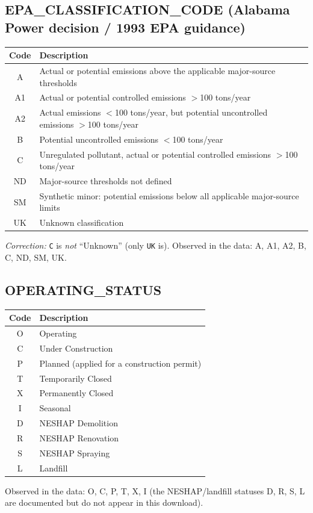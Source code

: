 \documentclass[11pt]{article}
\begin{document}
\subsection*{EPA\_CLASSIFICATION\_CODE (Alabama Power decision / 1993 EPA guidance)}
\begin{longtable}{C E}
\toprule
Code & Description \\ \midrule \endhead
A  & Actual or potential emissions above the applicable major-source thresholds \\
A1 & Actual or potential controlled emissions $>$100 tons/year \\
A2 & Actual emissions $<$100 tons/year, but potential uncontrolled emissions $>$100 tons/year \\
B  & Potential uncontrolled emissions $<$100 tons/year \\
C  & Unregulated pollutant, actual or potential controlled emissions $>$100 tons/year \\
ND & Major-source thresholds not defined \\
SM & Synthetic minor: potential emissions below all applicable major-source limits \\
UK & Unknown classification \\
\bottomrule
\end{longtable}
\noindent\emph{Correction:} \texttt{C} is \emph{not} ``Unknown'' (only \texttt{UK} is). Observed in the
data: A, A1, A2, B, C, ND, SM, UK.

\subsection*{OPERATING\_STATUS}
\begin{longtable}{C E}
\toprule
Code & Description \\ \midrule \endhead
O & Operating \\ C & Under Construction \\ P & Planned (applied for a construction permit) \\
T & Temporarily Closed \\ X & Permanently Closed \\ I & Seasonal \\
D & NESHAP Demolition \\ R & NESHAP Renovation \\ S & NESHAP Spraying \\ L & Landfill \\
\bottomrule
\end{longtable}
\noindent Observed in the data: O, C, P, T, X, I (the NESHAP/landfill statuses D, R, S, L are documented
but do not appear in this download).
\end{document}
